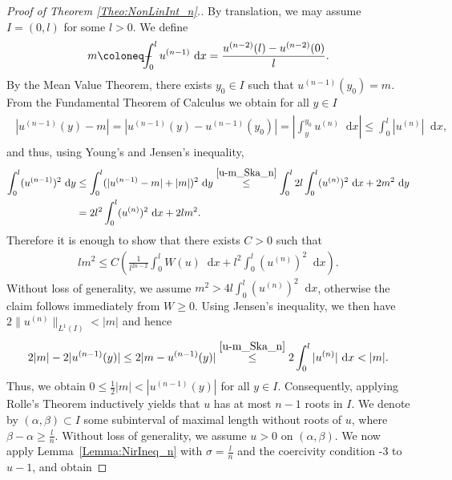 \documentclass{article}
\newcommand{\dd}{\mathop{}\mathrm{d}} %
\def\Xint#1{\mathchoice
	{\XXint\displaystyle\textstyle{#1}}%
	{\XXint\textstyle\scriptstyle{#1}}%
	{\XXint\scriptstyle\scriptscriptstyle{#1}}%
	{\XXint\scriptscriptstyle\scriptscriptstyle{#1}}%
	\!\int}
\def\XXint#1#2#3{{\setbox0=\hbox{$#1{#2#3}{\int}$}
		\vcenter{\hbox{$#2#3$}}\kern-.5\wd0}}
\def\dashint{\Xint-}
\newcommand{\mint}{\dashint}
\numberwithin{figure}{section}
\numberwithin{equation}{section}
\begin{document}
\begin{proof}[Proof of Theorem \ref{Theo:NonLinInt_n}.]
    By translation, we may assume $I=(0,l)$ for some $l>0$. We define 
        \begin{align}
            m\coloneq  \mint_0^l u^{(n-1)}\dd x = \frac{u^{(n-2)}(l)-u^{(n-2)}(0)}{l}.
        \end{align}
    By the Mean Value Theorem, there exists $y_0 \in I$ such that $u^{(n-1)}(y_0)=m$. From the Fundamental Theorem of Calculus we obtain for all $y \in I$
        \begin{align} \label{u-m_Ska_n}
        \begin{split}
            |u^{(n-1)}(y)-m| = |u^{(n-1)}(y)-u^{(n-1)}(y_0)| = \left|\int_y^{y_0} u^{(n)}\dd x\right| \leq \int_0^l |u^{(n)}|\dd x,
        \end{split}
        \end{align}
    and thus, using Young's and Jensen's inequality,
        \begin{align}
            \int_0^l (u^{(n-1)})^2 \dd y & 
            \leq \int_0^l (|u^{(n-1)}-m|+|m|)^2 \dd y
            \overset{\eqref{u-m_Ska_n}}{\leq} \int_0^l 2 l \int_0^l (u^{(n)})^2\dd x + 2 m^2 
            \dd y \\
            &= 2 l^2 \int_0^l (u^{(n)})^2\dd x + 2 l m^2.
        \end{align}
    Therefore it is enough to show that there exists $C>0$ such that
        \begin{align} \label{zz_Ska_n}
            l m^2 \leq C \left(\frac 1{l^{2n-2}} \int_0^l W(u)\dd x + l^2 \int_0^l(u^{(n)})^2\dd x\right).
        \end{align}
    Without loss of generality, we assume $m^2 > 4 l\int_0^l (u^{(n)})^2\dd x$, otherwise the claim follows immediately from $W \geq 0$. Using Jensen's inequality, we then have $2 \| u^{(n)}\|_{L^1(I)} < |m|$ and hence
        \begin{align} \label{m<u'_Ska_n}
            2|m|-2|u^{(n-1)}(y)| \leq 2 |m-u^{(n-1)}(y)| \overset{\eqref{u-m_Ska_n}}{\leq} 2 \int_0^l |u^{(n)}|\dd x < |m|.
        \end{align}
   Thus, we obtain $0 \leq \frac 12 |m| < |u^{(n-1)}(y)|$ for all $y \in I$. Consequently, applying Rolle's Theorem inductively yields that $u$ has at most $n-1$ roots in $I$. We denote by $(\alpha,\beta) \subset I$ some subinterval of maximal length without roots of $u$, where $\beta - \alpha \geq \frac {l}n$. Without loss of generality, we assume $u>0$ on $(\alpha,\beta)$. We now apply Lemma~\ref{Lemma:NirIneq_n} with $\sigma=\frac ln$ and the coercivity condition \hyp3 to $u-1$, and obtain

\end{proof}
\end{document}
